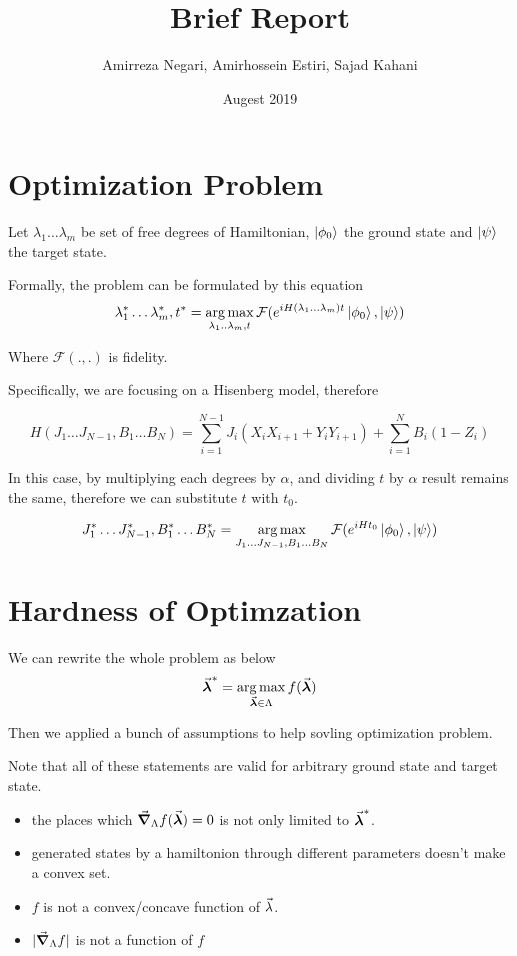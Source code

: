 \documentclass{article}
\title{Brief Report}
\author{Amirreza Negari, Amirhossein Estiri, Sajad Kahani}
\date{Augest 2019}
\DeclareMathOperator*{\argmax}{arg\,max}
\begin{document}
\maketitle

\section{Optimization Problem}
Let ${\lambda_1\dots\lambda_m}$ be set of free degrees of Hamiltonian, $\ket{\phi_0}$ the ground state and $\ket{\psi}$ the target state.

Formally, the problem can be formulated by this equation
\[ \lambda_1^*\dots\lambda_m^*, t^* = \argmax_{\lambda_1..\lambda_m, t} \mathcal{F}(e^{iH(\lambda_1\dots\lambda_m)t} \ket{\phi_0}, \ket{\psi}) \]

Where $\mathcal{F}(., .)$ is fidelity.

Specifically, we are focusing on a Hisenberg model, therefore

\[ H(J_1\dots J_{N-1}, B_1\dots B_N) = \sum_{i=1}^{N-1} J_i (X_i X_{i+1} + Y_i Y_{i+1}) + \sum_{i=1}^N B_i (1 - Z_i) \]

In this case, by multiplying each degrees by $\alpha$, and dividing $t$ by $\alpha$ result remains the same, therefore we can substitute $t$ with $t_0$.

\begin{equation} 
\label{eq:opt}
J_1^*\dots J_{N-1}^*, B_1^*\dots B_N^* = \argmax_{J_1\dots J_{N-1}, B_1\dots B_N} \mathcal{F}(e^{iHt_0} \ket{\phi_0}, \ket{\psi})
\end{equation}


\section{Hardness of Optimzation}

\newtheorem{theorem}{Theorem}

We can rewrite the whole problem as below
\[ \va*{\lambda}^* = \argmax_{\va*\lambda \in \Lambda} f(\va*{\lambda}) \]

Then we applied a bunch of assumptions to help sovling optimization problem.

Note that all of these statements are valid for arbitrary ground state and target state.

\begin{itemize}
 \item the places which $\grad_\Lambda f(\va*\lambda) = 0$ is not only limited to $\va*\lambda^*$.

 \item generated states by a hamiltonion through different parameters doesn't make a convex set.
 
 \item $f$ is not a convex/concave function of $\va\lambda$.
 
 \item $|\grad_\Lambda f|$ is not a function of $f$
\end{itemize}
\end{document}
